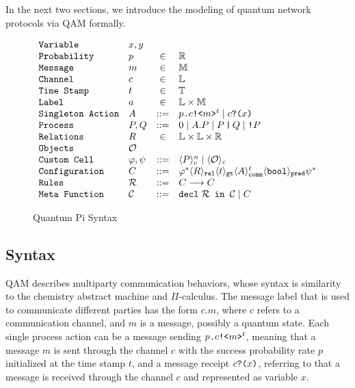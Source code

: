 In the next two sections, we introduce the modeling of quantum network protocols via QAM formally.

\begin{figure}[t]
{\small
  \[\begin{array}{llcl} 
      \texttt{Variable} & x,y \\
      \texttt{Probability} & p &\in &\mathbb{R}\\
      \texttt{Message} & m &\in& \mathbb{M}\\
    \texttt{Channel} & c &\in& \mathbb{L}\\
    \texttt{Time Stamp} & t &\in& \mathbb{T}\\
    \texttt{Label} & a &\in& \mathbb{L} \times \mathbb{M}\\
      \texttt{Singleton Action} & A & ::= & p\texttt{.}c\texttt{!<}m\texttt{>}^t \mid c\texttt{?(}x\texttt{)} \\
      \texttt{Process} & P,Q & ::= & 0 \mid A.P \mid P\,\texttt{|}\,Q \mid \texttt{!}P \\
      \texttt{Relations} & R & \in & \mathbb{L} \times \mathbb{L} \times \mathbb{R} \\
      \texttt{Objects} & \mathcal{O} \\
      \texttt{Custom Cell} & \varphi,\psi & ::= & \langle P \rangle^{n}_{c} \mid \langle \mathcal{O} \rangle_{c}\\
      \texttt{Configuration} & C & ::= & \varphi^* \langle R \rangle_{\texttt{rel}} \langle t \rangle_{\texttt{gt}}
                             \langle A \rangle^{t}_{\texttt{comm}} \langle \texttt{bool} \rangle_{\texttt{pred}} \psi^* \\
      \texttt{Rules} & \mathcal{R} & ::= & C \longrightarrow C \\
      \texttt{Meta Function} & \mathcal{C} & ::= & \texttt{decl}\;\mathcal{R}\texttt{ in }\mathcal{C} \mid C\\
    \end{array}
  \]
}
\caption{Quantum Pi Syntax}
  \label{fig:q-pi-syntax}
\end{figure}


\subsection{Syntax} \label{sec:qamsyntax}

QAM describes multiparty communication behaviors,
whose syntax is similarity to the chemistry abstract machine \cite{BERRY1992217} and $\Pi$-calculus.
The message label that is used to communicate different parties has the form $c.m$, 
where $c$ refers to a communication channel, and $m$ is a message, possibly a quantum state.
Each single process action can be a message sending $p\texttt{.}c\texttt{!<}m\texttt{>}^t$, meaning that a message $m$ is sent through the channel $c$ with the success probability rate $p$ initialized at the time stamp $t$, and a message receipt $c\texttt{?(}x\texttt{)}$, referring to that a message is received through the channel $c$ and represented as variable $x$.

